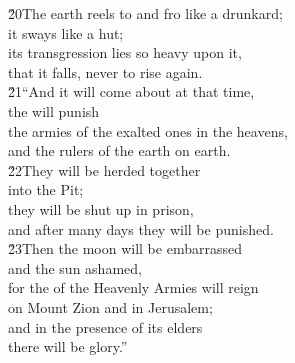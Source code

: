 \begin{poetry}
\poeml \v{20}The earth reels to and fro like a drunkard; \\
\poemll    it sways like a hut; \\
\poeml its transgression lies so heavy upon it, \\
\poemll    that it falls, never to rise again. \\
\poeml \v{21}``And it will come about at that time, \\
\poemll    the  will punish \\
\poeml the armies of the exalted ones in the heavens, \\
\poemll    and the rulers of the earth on earth. \\
\poeml \v{22}They will be herded together \\
\poemll    into the Pit; \\
\poeml they will be shut up in prison, \\
\poemll    and after many days they will be punished. \\
\poeml \v{23}Then the moon will be embarrassed \\
\poemll    and the sun ashamed, \\
\poeml for the  of the Heavenly Armies will reign \\
\poemll    on Mount Zion and in Jerusalem; \\
\poeml and in the presence of its elders \\
\poemll    there will be glory.''
\end{poetry}

